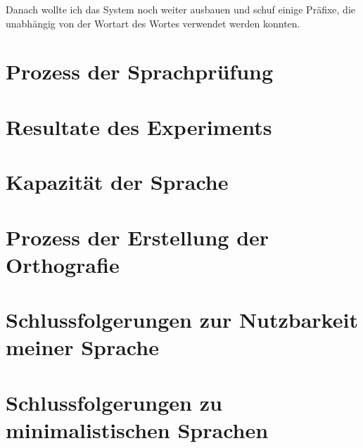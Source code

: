 \documentclass{article}
\begin{document}
Danach wollte ich das System noch weiter ausbauen und schuf einige Präfixe, die unabhängig von der Wortart des Wortes
verwendet werden konnten.


\section{Prozess der Sprachprüfung}



\section{Resultate des Experiments}



\section{Kapazität der Sprache}



\section{Prozess der Erstellung der Orthografie}



\section{Schlussfolgerungen zur Nutzbarkeit meiner Sprache}



\section{Schlussfolgerungen zu minimalistischen Sprachen}




\end{document}
